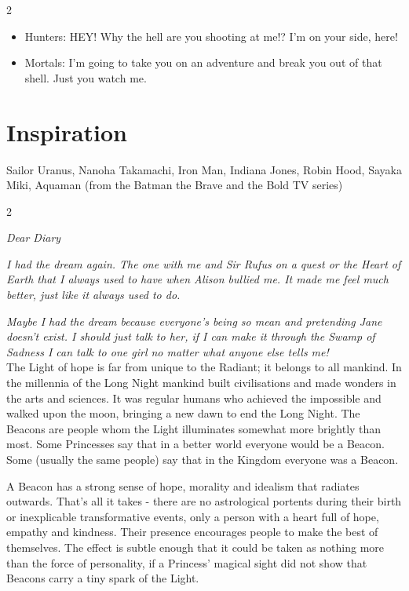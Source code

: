 \begin{multicols}{2}
\begin{itemize}
\item Hunters: HEY! Why the hell are you shooting at me!? I'm on your side, here!
\item Mortals: I'm going to take you on an adventure and break you out of that shell. Just you watch me. 
\end{itemize}

\section*{Inspiration}
Sailor Uranus, Nanoha Takamachi, Iron Man, Indiana Jones, Robin Hood, Sayaka Miki, Aquaman (from the Batman the Brave and the Bold TV series)

\end{multicols}\label{scha:Beacons}\begin{multicols}{2}\raggedcolumns

\noindent \textit{Dear Diary}

\textit{I had the dream again. The one with me and Sir Rufus on a quest or the Heart of Earth that I always used to have when Alison bullied me. It made me feel much better, just like it always used to do.}

\textit{Maybe I had the dream because everyone's being so mean and pretending Jane doesn't exist. I should just talk to her, if I can make it through the Swamp of Sadness I can talk to one girl no matter what anyone else tells me!}\\

\noindent The Light of hope is far from unique to the Radiant; it belongs to all mankind. In the millennia of the Long Night mankind built civilisations and made wonders in the arts and sciences. It was regular humans who achieved the impossible and walked upon the moon, bringing a new dawn to end the Long Night. The Beacons are people whom the Light illuminates somewhat more brightly than most. Some Princesses say that in a better world everyone would be a Beacon. Some (usually the same people) say that in the Kingdom everyone was a Beacon.

A Beacon has a strong sense of hope, morality and idealism that radiates outwards. That’s all it takes - there are no astrological portents during their birth or inexplicable transformative events, only a person with a heart full of hope, empathy and kindness. Their presence encourages people to make the best of themselves. The effect is subtle enough that it could be taken as nothing more than the force of personality, if a Princess' magical sight did not show that Beacons carry a tiny spark of the Light.


\end{multicols}
